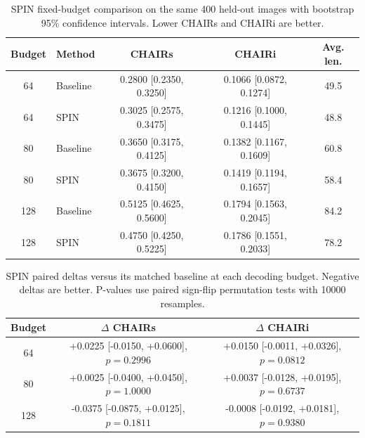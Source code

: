 \begin{table}[t]
\centering
\small
\caption{SPIN fixed-budget comparison on the same 400 held-out images with bootstrap 95\% confidence intervals. Lower CHAIRs and CHAIRi are better.}
\label{tab:spin_bootstrap}
\begin{tabular}{c l c c c}
\toprule
Budget & Method & CHAIRs & CHAIRi & Avg. len. \\
\midrule
64 & Baseline & 0.2800 [0.2350, 0.3250] & 0.1066 [0.0872, 0.1274] & 49.5 \\
64 & SPIN & 0.3025 [0.2575, 0.3475] & 0.1216 [0.1000, 0.1445] & 48.8 \\
80 & Baseline & 0.3650 [0.3175, 0.4125] & 0.1382 [0.1167, 0.1609] & 60.8 \\
80 & SPIN & 0.3675 [0.3200, 0.4150] & 0.1419 [0.1194, 0.1657] & 58.4 \\
128 & Baseline & 0.5125 [0.4625, 0.5600] & 0.1794 [0.1563, 0.2045] & 84.2 \\
128 & SPIN & 0.4750 [0.4250, 0.5225] & 0.1786 [0.1551, 0.2033] & 78.2 \\
\bottomrule
\end{tabular}
\end{table}

\begin{table}[t]
\centering
\small
\caption{SPIN paired deltas versus its matched baseline at each decoding budget. Negative deltas are better. P-values use paired sign-flip permutation tests with 10000 resamples.}
\label{tab:spin_paired_deltas}
\begin{tabular}{c c c}
\toprule
Budget & $\Delta$ CHAIRs & $\Delta$ CHAIRi \\
\midrule
64 & +0.0225 [-0.0150, +0.0600], $p=0.2996$ & +0.0150 [-0.0011, +0.0326], $p=0.0812$ \\
80 & +0.0025 [-0.0400, +0.0450], $p=1.0000$ & +0.0037 [-0.0128, +0.0195], $p=0.6737$ \\
128 & -0.0375 [-0.0875, +0.0125], $p=0.1811$ & -0.0008 [-0.0192, +0.0181], $p=0.9380$ \\
\bottomrule
\end{tabular}
\end{table}
